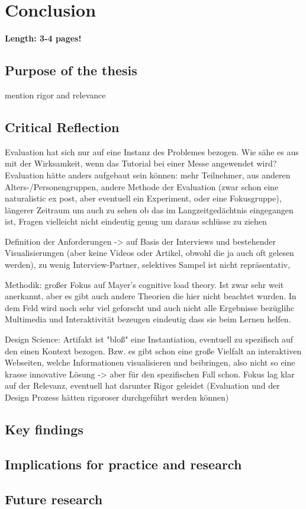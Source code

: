 \chapter{Conclusion}

\textbf{Length: 3-4 pages!}

\section{Purpose of the thesis} \label{sec:findings}

mention rigor and relevance

\section{Critical Reflection} \label{sec:Reflection}
Evaluation hat sich nur auf eine Instanz des Problemes bezogen. Wie sähe es aus mit der Wirksamkeit, wenn das Tutorial bei einer Messe angewendet wird?
Evaluation hätte anders aufgebaut sein können: mehr Teilnehmer, aus anderen Alters-/Personengruppen, andere Methode der Evaluation (zwar schon eine naturalistic ex post, aber eventuell ein Experiment, oder eine Fokusgruppe), längerer Zeitraum um auch zu sehen ob das im Langzeitgedächtnis eingegangen ist, Fragen vielleicht nicht eindeutig genug um daraus schlüsse zu ziehen

Definition der Anforderungen -> auf Basis der Interviews und bestehender Visualisierungen (aber keine Videos oder Artikel, obwohl die ja auch oft gelesen werden), zu wenig Interview-Partner, selektives Sampel ist nicht repräsentativ, 

Methodik: großer Fokus auf Mayer's cognitive load theory. Ist zwar sehr weit anerkannt, aber es gibt auch andere Theorien die hier nicht beachtet wurden. In dem Feld wird noch sehr viel geforscht und auch nicht alle Ergebnisse bezüglihc Multimedia und Interaktivität bezeugen eindeutig dass sie beim Lernen helfen.

Design Science: Artifakt ist "bloß" eine Instantiation, eventuell zu spezifisch auf den einen Kontext bezogen. Bzw. es gibt schon eine große Vielfalt an interaktiven Webseiten, welche Informationen visualisieren und beibringen, also nicht so eine krasse innovative Lösung -> aber für den spezifischen Fall schon.
Fokus lag klar auf der Relevanz, eventuell hat darunter Rigor geleidet (Evaluation und der Design Prozess hätten rigoroser durchgeführt werden können)

\section{Key findings}

\section{Implications for practice and research} \label{Implications}

\section{Future research} \label{sec:FutureResearch}